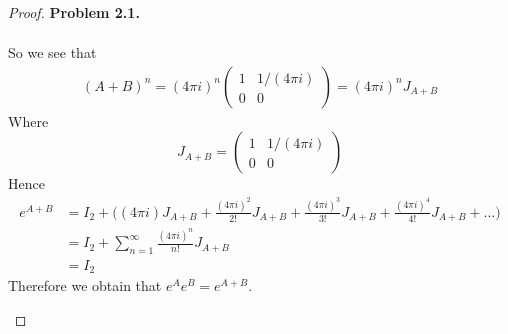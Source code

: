 \documentclass[11pt]{article}
\theoremstyle{definition}
\begin{document}
\begin{proof}{\textbf{Problem 2.1.}}
\begin{itemize}
\begin{align*}
    \end{align*}
    So we see that
    \begin{align*}
        (A + B)^n = (4\pi i)^{n}\begin{pmatrix} 1 & 1/(4\pi i)\\ 0 & 0\end{pmatrix}
        = (4\pi i)^{n}J_{A + B}
    \end{align*}
    Where
    $$J_{A+B} = \begin{pmatrix} 1 & 1/(4\pi i)\\ 0 & 0 \end{pmatrix}$$
    Hence 
    \begin{align*}
        e^{A + B} &= I_2 + \bigg((4\pi i) J_{A+B}+ \frac{(4\pi i)^2}{2!}J_{A+B}
        + \frac{(4\pi i)^3}{3!}J_{A+B} + \frac{(4\pi i)^4}{4!}J_{A+B} +...\bigg)\\
        &= I_2 + \sum_{n=1}^\infty \frac{(4\pi i)^n}{n!}J_{A+B}\\
        &= I_2
    \end{align*}
    Therefore we obtain that $e^Ae^B = e^{A+B}$.
\end{itemize}
\end{proof}
\cleardoublepage
\end{document}
